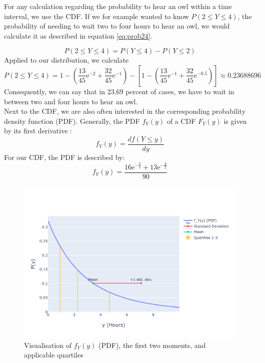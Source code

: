 For any calculation regarding the probability to hear an owl within a time interval, we use the CDF. If we for example wanted to know $P(2 \leq Y \leq 4)$, the probability of needing to wait two to four hours to hear an owl, we would calculate it as described in equation \ref{eq:prob24}.

\begin{equation} P(2 \leq Y \leq 4) = P(Y \leq 4) - P(Y \leq 2)
\label{eq:prob24}
\end{equation}
Applied to our distribution, we calculate
\begin{equation} P (2 \leq Y \leq 4) =1-\left( \dfrac{13}{45}\mathrm{e}^{-2} + \dfrac{32}{45}\mathrm{e}^{-1}\right) -\left[ 1-\left( \dfrac{13}{45}\mathrm{e}^{-1} + \dfrac{32}{45}\mathrm{e}^{-0.5}\right)\right] 	\approx 0.23688696
\label{eq:probcalc24}
\end{equation}
Consequently, we can say that in 23.69 percent of cases, we have to wait in between two and four hours to hear an owl.
\\

Next to the CDF, we are also often interested in the corresponding probability density function (PDF). Generally, the PDF $f_Y(y)$ of a CDF $F_Y(y)$ is given by its first derivative \cite[Chapter~4.3]{montgomery2010applied}:
\begin{equation}
f_Y(y) = \frac{df(Y \leq y)}{dy}
\label{eq:firstderivative}
\end{equation}
For our CDF, the PDF is described by:
\begin{equation}
f_Y(y) = \dfrac{16\mathrm{e}^{-\frac{y}{4}}+13\mathrm{e}^{-\frac{y}{2}}}{90}
\label{eq:pdf}
\end{equation}

\begin{figure}[h]
\centering
\includegraphics[width=17cm]{pics/1c2.pdf}
\caption{Visualisation of $f_Y(y)$ (PDF), the first two moments, and applicable quartiles}
\label{fig:1c2}
\end{figure}
\FloatBarrier


